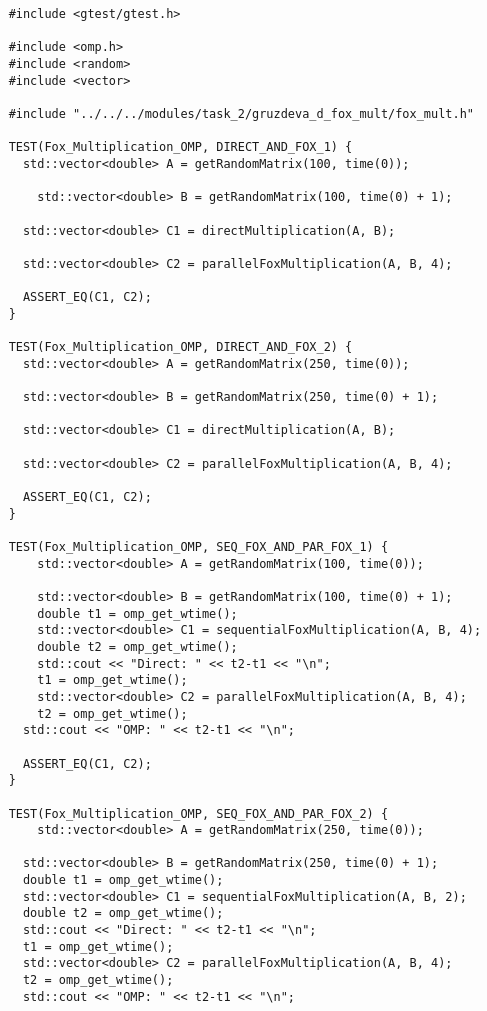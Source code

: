 \documentclass{article}
\begin{document}
\begin{lstlisting}
	#include <gtest/gtest.h>

	#include <omp.h>
	#include <random>
	#include <vector>

	#include "../../../modules/task_2/gruzdeva_d_fox_mult/fox_mult.h"

	TEST(Fox_Multiplication_OMP, DIRECT_AND_FOX_1) {
  	  std::vector<double> A = getRandomMatrix(100, time(0));

    	std::vector<double> B = getRandomMatrix(100, time(0) + 1);

  	  std::vector<double> C1 = directMultiplication(A, B);

  	  std::vector<double> C2 = parallelFoxMultiplication(A, B, 4);

  	  ASSERT_EQ(C1, C2);
	}

	TEST(Fox_Multiplication_OMP, DIRECT_AND_FOX_2) {
  	  std::vector<double> A = getRandomMatrix(250, time(0));

  	  std::vector<double> B = getRandomMatrix(250, time(0) + 1);

  	  std::vector<double> C1 = directMultiplication(A, B);

  	  std::vector<double> C2 = parallelFoxMultiplication(A, B, 4);

  	  ASSERT_EQ(C1, C2);
	}

	TEST(Fox_Multiplication_OMP, SEQ_FOX_AND_PAR_FOX_1) {
    	std::vector<double> A = getRandomMatrix(100, time(0));

    	std::vector<double> B = getRandomMatrix(100, time(0) + 1);
    	double t1 = omp_get_wtime();
    	std::vector<double> C1 = sequentialFoxMultiplication(A, B, 4);
    	double t2 = omp_get_wtime();
    	std::cout << "Direct: " << t2-t1 << "\n";
    	t1 = omp_get_wtime();
    	std::vector<double> C2 = parallelFoxMultiplication(A, B, 4);
    	t2 = omp_get_wtime();
  	  std::cout << "OMP: " << t2-t1 << "\n";

  	  ASSERT_EQ(C1, C2);
	}

	TEST(Fox_Multiplication_OMP, SEQ_FOX_AND_PAR_FOX_2) {
    	std::vector<double> A = getRandomMatrix(250, time(0));

  	  std::vector<double> B = getRandomMatrix(250, time(0) + 1);
  	  double t1 = omp_get_wtime();
  	  std::vector<double> C1 = sequentialFoxMultiplication(A, B, 2);
  	  double t2 = omp_get_wtime();
  	  std::cout << "Direct: " << t2-t1 << "\n";
  	  t1 = omp_get_wtime();
  	  std::vector<double> C2 = parallelFoxMultiplication(A, B, 4);
  	  t2 = omp_get_wtime();
  	  std::cout << "OMP: " << t2-t1 << "\n";


\end{lstlisting}
\end{document}
